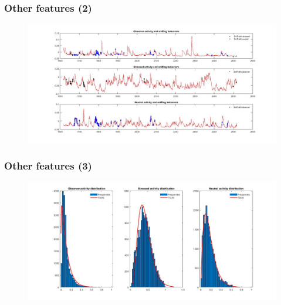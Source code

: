 \documentclass{beamer}
\begin{document}
\begin{frame}
\frametitle{Other features (2)}





\begin{figure}[H]
	\begin{center}
		\hspace*{-1cm}
		\includegraphics[scale=.30]{sniff_plot.jpg} 
	\end{center}  
	
	
\end{figure}


\end{frame}	


\begin{frame}
\frametitle{Other features (3)}





\begin{figure}[H]
	\begin{center}
		\hspace*{-1cm}
		\includegraphics[scale=.30]{hist.jpg} 
	\end{center}  
	
	
\end{figure}


\end{frame}	
\end{document}
